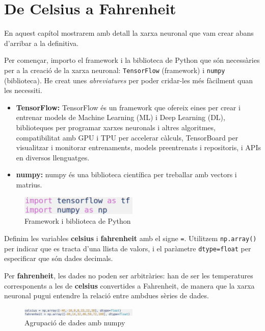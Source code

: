 \chapter{De Celsius a Fahrenheit}\label{a:CelsiusFahrenheit}
En aquest capítol mostrarem amb detall la xarxa neuronal que vam crear abans d’arribar a la definitiva.

Per començar, importo el framework i la biblioteca de Python que són necessàries per a la creació de la xarxa neuronal: \texttt{TensorFlow} (framework) i \texttt{numpy} (biblioteca). He creat unes \textit{abreviatures} per poder cridar-les més fàcilment quan les necessiti.

\begin{itemize}
\item \textbf{TensorFlow:} TensorFlow és un framework que ofereix eines per crear i entrenar models de Machine Learning (ML) i Deep Learning (DL), biblioteques per programar xarxes neuronals i altres algoritmes, compatibilitat amb GPU i TPU per accelerar càlculs, TensorBoard per visualitzar i monitorar entrenaments, models preentrenats i repositoris, i APIs en diversos llenguatges.
\item \textbf{numpy:} numpy és una biblioteca científica per treballar amb vectors i matrius.
\end{itemize}

\begin{figure}[H]
\centering
\includegraphics[width=0.5\textwidth]{./figures/1.png}
\caption{Framework i biblioteca de Python}
\end{figure}

Definim les variables \textbf{celsius} i \textbf{fahrenheit} amb el signe \texttt{=}. Utilitzem \texttt{np.array()} per indicar que es tracta d’una llista de valors, i el paràmetre \texttt{dtype=float} per especificar que són dades decimals.

Per \textbf{fahrenheit}, les dades no poden ser arbitràries: han de ser les temperatures corresponents a les de \textbf{celsius} convertides a Fahrenheit, de manera que la xarxa neuronal pugui entendre la relació entre ambdues sèries de dades.

\begin{figure}[H]
\centering
\includegraphics[width=0.5\textwidth]{./figures/2.png}
\caption{Agrupació de dades amb numpy}
\end{figure}

